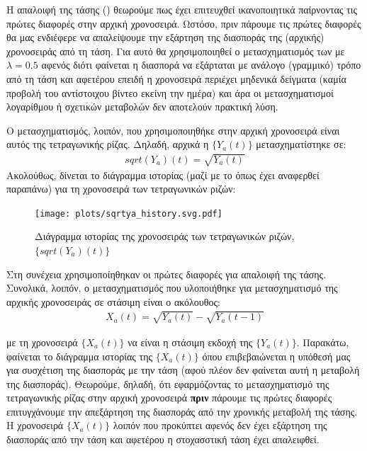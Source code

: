 Η απαλοιφή της τάσης () θεωρούμε πως έχει επιτευχθεί ικανοποιητικά παίρνοντας τις πρώτες διαφορές στην αρχική χρονοσειρά. Ωστόσο, πριν πάρουμε τις πρώτες διαφορές θα μας ενδιέφερε να απαλείψουμε την εξάρτηση της διασποράς της (αρχικής) χρονοσειράς από τη τάση. Για αυτό θα χρησιμοποιηθεί ο μετασχηματισμός των  με $\lambda=0.5$ αφενός διότι φαίνεται η διασπορά να εξάρταται με ανάλογο (γραμμικό) τρόπο από τη τάση και αφετέρου επειδή η χρονοσειρά περιέχει μηδενικά δείγματα (καμία προβολή του αντίστοιχου βίντεο εκείνη την ημέρα) και άρα οι μετασχηματισμοί λογαρίθμου ή σχετικών μεταβολών δεν αποτελούν πρακτική λύση.

Ο μετασχηματισμός, λοιπόν, που χρησιμοποιηθήκε στην αρχική χρονοσειρά είναι αυτός της τετραγωνικής ρίζας. Δηλαδή, αρχικά η $\{Y_a(t)\}$ μετασχηματίστηκε σε:
\begin{align}
    sqrt(Y_a)(t) = \sqrt{Y_a(t)}
\end{align}
Ακολούθως, δίνεται το διάγραμμα ιστορίας (μαζί με το  όπως έχει αναφερθεί παραπάνω) για τη χρονοσειρά των τετραγωνικών ριζών:

\begin{figure}[H]
    \begin{center}
        \texttt{[image: plots/sqrtya\_history.svg.pdf]}
        \caption{Διάγραμμα ιστορίας της χρονοσειράς των τετραγωνικών ριζών, $\{sqrt(Y_a)(t)\}$}
        \label{fig:sqrtya_history}
    \end{center}
\end{figure}

Στη συνέχεια χρησιμοποίηθηκαν οι πρώτες διαφορές για απαλοιφή της τάσης. Συνολικά, λοιπόν, ο μετασχηματισμός που υλοποιήθηκε για μετασχηματισμό της αρχικής χρονοσειράς σε στάσιμη είναι ο ακόλουθος:
\begin{align}
    X_a(t) = \sqrt{Y_a(t)} - \sqrt{Y_a(t-1)}
    \label{eq:xa_t}
\end{align}

με τη χρονοσειρά $\{X_a(t)\}$ να είναι η στάσιμη εκδοχή της $\{Y_a(t)\}$. Παρακάτω, φαίνεται το διάγραμμα ιστορίας της $\{X_a(t)\}$ όπου επιβεβαιώνεται η υπόθεσή μας για συσχέτιση της διασποράς με την τάση (αφού πλέον δεν φαίνεται αυτή η  μεταβολή της διασποράς). Θεωρούμε, δηλαδή, ότι εφαρμόζοντας το μετασχηματισμό της τετραγωνικής ρίζας στην αρχική χρονοσειρά \textbf{πριν} πάρουμε τις πρώτες διαφορές επιτυγχάνουμε την απεξάρτηση της διασποράς από την χρονικής μεταβολή της τάσης. Η χρονοσειρά $\{X_a(t)\}$ λοιπόν που προκύπτει αφενός δεν έχει εξάρτηση της διασποράς από την τάση και αφετέρου η στοχασστική τάση έχει απαλειφθεί.

